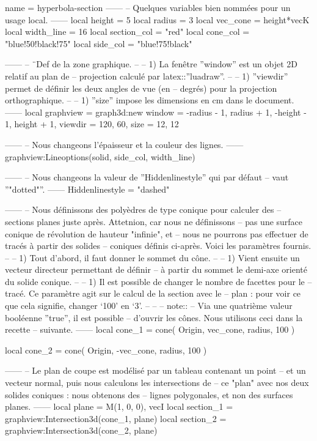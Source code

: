 \documentclass{standalone}
\begin{document}
\begin{luadraw}{name = hyperbola-section}
------
-- Quelques variables bien nommées pour un usage local.
------
local height      =  5
local radius      =  3
local vec_cone    = height*vecK
local width_line  =  16
local section_col = "red"
local cone_col    = "blue!50!black!75"
local side_col    = "blue!75!black"

------
-- ¨Def de la zone graphique.
--
--     1) La fenêtre ''window'' est un objet 2D relatif au plan de
--     projection calculé par latex::''luadraw''.
--
--     1) ''viewdir'' permet de définir les deux angles de vue (en
--     degrés) pour la projection orthographique.
--
--     1) ''size'' impose les dimensions en cm dans le document.
------
local graphview = graph3d:new{
  window  = {-radius - 1, radius + 1, -height - 1, height + 1},
  viewdir = {120, 60},
  size    = {12, 12}
}

------
-- Nous changeons l'épaisseur et la couleur des lignes.
------
graphview:Lineoptions(solid, side_col, width_line)

------
-- Nous changeons la valeur de ''Hiddenlinestyle'' qui par défaut
-- vaut ''"dotted"''.
------
Hiddenlinestyle = "dashed"

------
-- Nous définissons des polyèdres de type conique pour calculer des
-- sections planes juste après. Attetnion, car nous ne définissons
-- pas une surface conique de révolution de hauteur "infinie", et
-- nous ne pourrons pas effectuer de tracés à partir des solides
-- coniques définis ci-après. Voici les paramètres fournis.
--
--     1) Tout d'abord, il faut donner le sommet du cône.
--
--     1) Vient ensuite un vecteur directeur permettant de définir
--     à partir du sommet le demi-axe orienté du solide conique.
--
--     1) Il est possible de changer le nombre de facettes pour le
--     tracé. Ce paramètre agit sur le calcul de la section avec le
--     plan : pour voir ce que cela signifie, changer `100' en `3'.
--
--
-- note::
--     Via une quatrième valeur booléenne ''true'', il est possible
--     d'ouvrir les cônes. Nous utilisons ceci dans la recette
--     suivante.
------
local cone_1 = cone(
  Origin, vec_cone, radius,
  100
)

local cone_2 = cone(
  Origin,  -vec_cone, radius,
  100
)

------
-- Le plan de coupe est modélisé par un tableau contenant un point
-- et un vecteur normal, puis nous calculons les intersections de
-- ce "plan" avec nos deux solides coniques : nous obtenons des
-- lignes polygonales, et non des surfaces planes.
------
local plane     = {M(1, 0, 0), vecI}
local section_1 = graphview:Intersection3d(cone_1, plane)
local section_2 = graphview:Intersection3d(cone_2, plane)


\end{luadraw}
\end{document}
